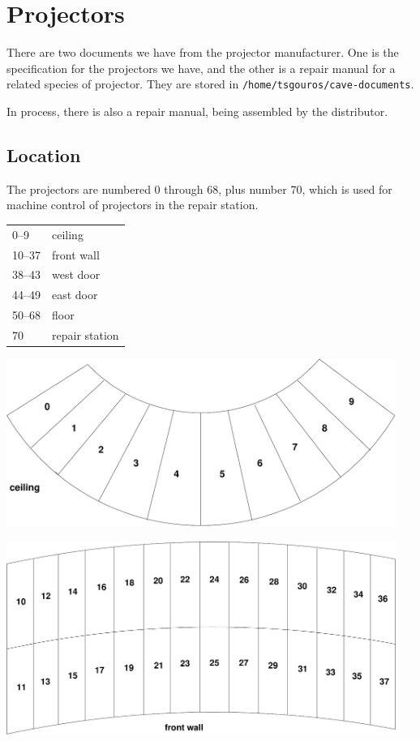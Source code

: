 \documentclass[11pt]{article}
\begin{document}
\section{Projectors}

There are two documents we have from the projector manufacturer.  One
is the specification for the projectors we have, and the other is a
repair manual for a related species of projector.  They are stored in
\texttt{/home/tsgouros/cave-documents}.

In process, there is also a repair manual, being assembled by the
distributor.


\subsection{Location}

The projectors are numbered 0 through 68, plus number 70, which is
used for machine control of projectors in the repair station.

\begin{center}
\begin{tabular}{ll}
0--9 & ceiling \\
10--37 & front wall \\
38--43 & west door \\
44--49 & east door \\
50--68 & floor \\
70 & repair station
\end{tabular}
\end{center}

\begin{center}
\includegraphics[width=5in]{ceiling.pdf}
\end{center}

\begin{center}
\includegraphics[width=5in]{wall.pdf}
\end{center}
\end{document}
